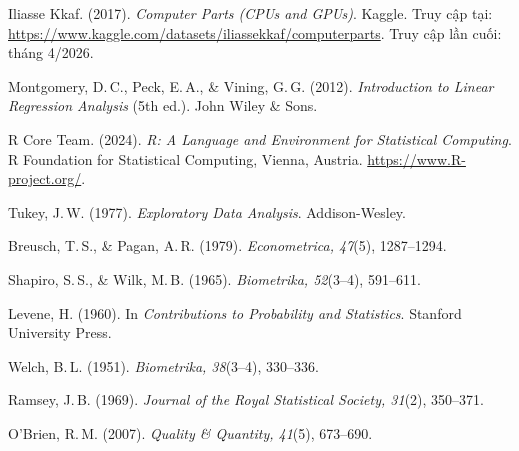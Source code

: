 \documentclass[12pt,a4paper]{article}
\begin{document}
\begin{enumerate}[leftmargin=1.5em, label={[\arabic*]}]

  \item Iliasse Kkaf. (2017). \textit{Computer Parts (CPUs and GPUs)}. Kaggle. Truy cập
        tại: \url{https://www.kaggle.com/datasets/iliassekkaf/computerparts}. Truy cập lần
        cuối: tháng 4/2026.

  \item Montgomery, D.\,C., Peck, E.\,A., \& Vining, G.\,G. (2012). \textit{Introduction
        to Linear Regression Analysis} (5th ed.). John Wiley \& Sons.

  \item R Core Team. (2024). \textit{R: A Language and Environment for Statistical
        Computing}. R Foundation for Statistical Computing, Vienna, Austria.
        \url{https://www.R-project.org/}.

  \item Tukey, J.\,W. (1977). \textit{Exploratory Data Analysis}. Addison-Wesley.

  \item Breusch, T.\,S., \& Pagan, A.\,R. (1979). \textit{Econometrica, 47}(5),
        1287--1294.

  \item Shapiro, S.\,S., \& Wilk, M.\,B. (1965). \textit{Biometrika, 52}(3--4),
        591--611.

  \item Levene, H. (1960). In \textit{Contributions to Probability and Statistics}.
        Stanford University Press.

  \item Welch, B.\,L. (1951). \textit{Biometrika, 38}(3--4), 330--336.

  \item Ramsey, J.\,B. (1969). \textit{Journal of the Royal Statistical Society,
        31}(2), 350--371.

  \item O'Brien, R.\,M. (2007). \textit{Quality \& Quantity, 41}(5), 673--690.

\end{enumerate}
\end{document}
